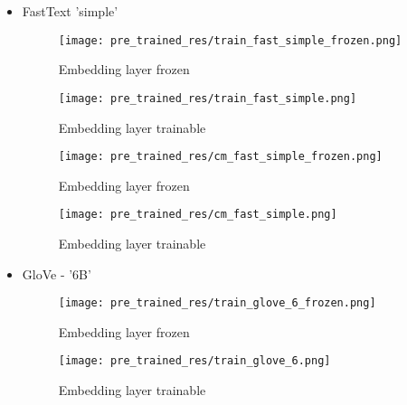 \documentclass{article}
\begin{document}
\begin{itemize}

    \item FastText 'simple'
    \begin{figure}[H]
    \centering
    \begin{minipage}{.5\linewidth}
        \centering
        \texttt{[image: pre\_trained\_res/train\_fast\_simple\_frozen.png]}
        \vspace{-1.0em}
        \caption{Embedding layer frozen}

    \end{minipage}%
    \begin{minipage}{.5\textwidth}
      \centering
      \texttt{[image: pre\_trained\_res/train\_fast\_simple.png]}
      \vspace{-1.0em}
      \caption{Embedding layer trainable}

    \end{minipage}
    \end{figure}
    \begin{figure}[H]
    \centering
    \begin{minipage}{.5\linewidth}
        \centering
        \texttt{[image: pre\_trained\_res/cm\_fast\_simple\_frozen.png]}
        \vspace{-2.2em}
        \caption{Embedding layer frozen}

    \end{minipage}%
    \begin{minipage}{.5\textwidth}
      \centering
      \texttt{[image: pre\_trained\_res/cm\_fast\_simple.png]}
      \vspace{-2.2em}
      \caption{Embedding layer trainable}

    \end{minipage}
    \end{figure}
    
    \item GloVe - '6B'
    \begin{figure}[H]
    \centering
    \begin{minipage}{.5\linewidth}
        \centering
        \texttt{[image: pre\_trained\_res/train\_glove\_6\_frozen.png]}
        \vspace{-1.0em}
        \caption{Embedding layer frozen}

    \end{minipage}%
    \begin{minipage}{.5\textwidth}
      \centering
      \texttt{[image: pre\_trained\_res/train\_glove\_6.png]}
      \vspace{-1.0em}
      \caption{Embedding layer trainable}


\end{minipage}
\end{figure}
\end{itemize}
\end{document}
